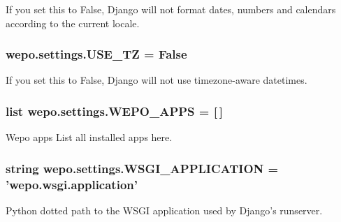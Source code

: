 If you set this to False, Django will not format dates, numbers and calendars according to the current locale. 

\hypertarget{namespacewepo_1_1settings_afbf0f0ae28ca43f39ae949a6e1cc61e9}{
\subsubsection[{U\-S\-E\-\_\-\-T\-Z}]{\setlength{\rightskip}{0pt plus 5cm}wepo.\-settings.\-U\-S\-E\-\_\-\-T\-Z = False}}\label{namespacewepo_1_1settings_afbf0f0ae28ca43f39ae949a6e1cc61e9}


If you set this to False, Django will not use timezone-\/aware datetimes. 

\hypertarget{namespacewepo_1_1settings_a74d020979efd117e8d7ae92a0e025ea5}{
\subsubsection[{W\-E\-P\-O\-\_\-\-A\-P\-P\-S}]{\setlength{\rightskip}{0pt plus 5cm}list wepo.\-settings.\-W\-E\-P\-O\-\_\-\-A\-P\-P\-S = \mbox{[}$\,$\mbox{]}}}\label{namespacewepo_1_1settings_a74d020979efd117e8d7ae92a0e025ea5}


Wepo apps List all installed apps here. 

\hypertarget{namespacewepo_1_1settings_aaa11b47894bdc61fd4ecfb02a1aeb72c}{
\subsubsection[{W\-S\-G\-I\-\_\-\-A\-P\-P\-L\-I\-C\-A\-T\-I\-O\-N}]{\setlength{\rightskip}{0pt plus 5cm}string wepo.\-settings.\-W\-S\-G\-I\-\_\-\-A\-P\-P\-L\-I\-C\-A\-T\-I\-O\-N = '{\bf wepo.\-wsgi.\-application}'}}\label{namespacewepo_1_1settings_aaa11b47894bdc61fd4ecfb02a1aeb72c}


Python dotted path to the W\-S\-G\-I application used by Django's runserver. 

